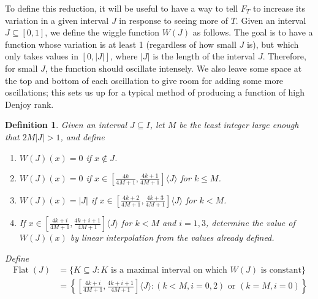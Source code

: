 \documentclass[12pt]{amsart}
\newtheorem{definition}{Definition}
\renewcommand{\flat}{\operatorname{Flat}}
\newcommand{\mathaugust}{}%
\begin{document}
To define this reduction, it will be useful to have a way to tell $F_T$ to 
increase its variation in a given interval $J$ 
in response to seeing more of $T$. 
Given an interval $J \subseteq [0,1]$, we define the wiggle function $W(J)$ 
as follows.  The goal is to have a function whose variation is at least 1 
(regardless of how small $J$ is), but which only takes values in $[0,|J|]$, 
where $|J|$ is the length of the interval $J$.  Therefore, for small $J$, 
the function should oscillate intensely.  We also leave some space at 
the top and bottom of each oscillation to give room for adding some more 
oscillations; this sets us up for a typical method of producing a function of 
high Denjoy rank.  
\begin{definition} Given an interval $J\subseteq I$, 
let $M$ be the least integer large enough that $2M|J| > 1$, and define
\begin{enumerate}
\item $W(J)(x) = 0$ if $x \not\in J$.
\item $W(J)(x) = 0$ if 
$x \in [\frac{4k}{4M+1}, \frac{4k+1}{4M+1}]\langle J\rangle$ for $k\leq M$.
\item $W(J)(x) = |J|$ if
$x \in [\frac{4k+2}{4M+1}, \frac{4k+3}{4M+1}]\langle J\rangle$ for $k<M$.
\item If $x \in [\frac{4k+i}{4M+1}, \frac{4k+i+1}{4M+1}]\langle J\rangle$ 
for $k<M$ and $i=1,3$, determine the value of $W(J)(x)$ by linear 
interpolation from the values already defined.
\end{enumerate}
Define 
\begin{align*}\flat(J) &= \{K \subseteq J : K \text{ is a maximal interval on which }
W(J) \text{ is constant}\}\\
 &= \left\{\left[\frac{4k+i}{4M+1}, \frac{4k+i+1}{4M+1}\right]\langle J\rangle : \mathaugust{(k < M, i = 0,2) \text{ or } (k = M, i = 0)}\right\}\end{align*}
\end{definition}
\end{document}
